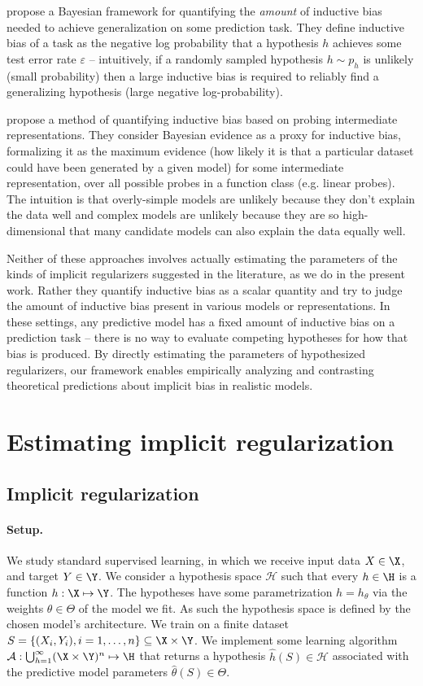 \documentclass[10pt]{article}
\begin{document}
\cite{boopathy_towards_2024} propose a Bayesian framework for quantifying the \emph{amount} of inductive bias needed to achieve generalization on some prediction task. They define inductive bias of a task as the negative log probability that a hypothesis $h$ achieves some test error rate $\varepsilon$ -- intuitively, if a randomly sampled hypothesis $h\sim p_h$ is unlikely (small probability) then a large inductive bias is required to reliably find a generalizing hypothesis (large negative log-probability). 

\cite{immer_probing_2022} propose a method of quantifying inductive bias based on probing intermediate representations. They consider Bayesian evidence as a proxy for inductive bias, formalizing it as the maximum evidence (how likely it is that a particular dataset could have been generated by a given model) for some intermediate representation, over all possible probes in a function class (e.g. linear probes). The intuition is that overly-simple models are unlikely because they don't explain the data well and complex models are unlikely because they are so high-dimensional that many candidate models can also explain the data equally well.

Neither of these approaches involves actually estimating the parameters of the kinds of implicit regularizers suggested in the literature, as we do in the present work. Rather they quantify inductive bias as a scalar quantity and try to judge the amount of inductive bias present in various models or representations. In these settings, any predictive model has a fixed amount of inductive bias on a prediction task -- there is no way to evaluate competing hypotheses for how that bias is produced. By directly estimating the parameters of hypothesized regularizers, our framework enables empirically analyzing and contrasting theoretical predictions about implicit bias in realistic models.

\section{Estimating implicit regularization}
\subsection{Implicit regularization}

\paragraph{Setup.}
We study standard supervised learning, in which we receive input data $X \in \X$, and target $Y \in \Y$.
We consider a hypothesis space  $\mathcal{H}$ 
such that every $h \in \H$ is a function $h: \X \mapsto \Y$. 
The hypotheses have some parametrization $h = h_\theta$ via the weights $\theta \in \Theta$ of the model we fit. As such the hypothesis space is defined by the chosen model's architecture. We train on a finite dataset $S = \left\{ (X_i, Y_i), i=1,\ldots,n\right\} \subseteq \X \times \Y$. 
We implement some learning algorithm 
$\mathcal{A} : \bigcup_{h=1}^\infty (\X \times \Y)^n \mapsto \H$
that returns a hypothesis $\hat h(S) \in \mathcal{H}$ associated with the predictive model parameters $\hat \theta(S) \in \Theta$.
\end{document}

